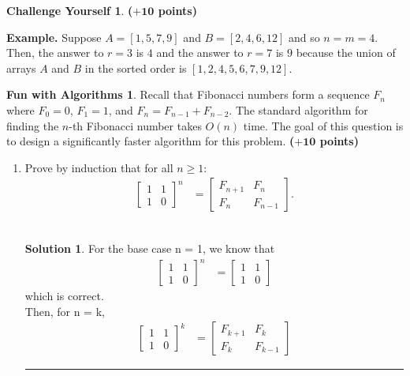 \documentclass{article}
\theoremstyle{definition}
\newtheorem*{fun}{Fun with Algorithms}
\newtheorem*{challenge}{Challenge Yourself}
\def\fline{\rule{0.75\linewidth}{0.5pt}}
\newcommand{\finishline}{\begin{center}\fline\end{center}}
\newtheorem*{solution*}{Solution}
\newenvironment{solution}{\begin{solution*}}{{\finishline} \end{solution*}}
\newcommand{\grade}[1]{\hfill{\textbf{($\mathbf{#1}$ points)}}}
\begin{document}
\begin{challenge}
	
	\grade{+10}
	
	\textbf{Example.} Suppose $A=[1,5,7,9]$ and $B=[2,4,6,12]$ and so $n=m=4$. Then, the answer to $r=3$ is $4$ and the answer to $r=7$ is $9$ because the union of arrays $A$ and $B$ in the sorted order is $[1,2,4,5,6,7,9,12]$. 
\end{challenge}

\smallskip

\begin{fun}
Recall that Fibonacci numbers form a sequence $F_n$ where $F_0 = 0$, $F_1 = 1$, and $F_n = F_{n-1} + F_{n-2}$. 
The standard algorithm for finding the $n$-th Fibonacci number takes $O(n)$ time. The goal of this question is to design a significantly faster algorithm for this problem. \grade{+10}
		\begin{enumerate}[label=(\alph*)]
		\item Prove by induction that for all $n \geq 1$: 
		\begin{align*}
			\begin{bmatrix}
				1 & 1 \\
				1 & 0
			\end{bmatrix}^n
			&= 	\begin{bmatrix}
				F_{n+1} & F_n \\
				F_n & F_{n-1}
			\end{bmatrix}.
		\end{align*} \\
		
	\begin{solution}
		
		For the base case n = 1, we know that 	
		\begin{align*}
			 \begin{bmatrix}
				1 & 1 \\
				1 & 0
			\end{bmatrix}^n
			&= 	\begin{bmatrix}
				1 & 1 \\
				1 & 0
			\end{bmatrix}
		\end{align*}
		which is correct. \\
		
		Then, for n = k,
		\begin{align*}
			\begin{bmatrix}
				1 & 1 \\
				1 & 0
			\end{bmatrix}^k
			&= 	\begin{bmatrix}
				F_{k+1} & F_k \\
				F_k & F_{k-1}
			\end{bmatrix}
		\end{align*}
		

\end{solution}
\end{enumerate}
\end{fun}
\end{document}
